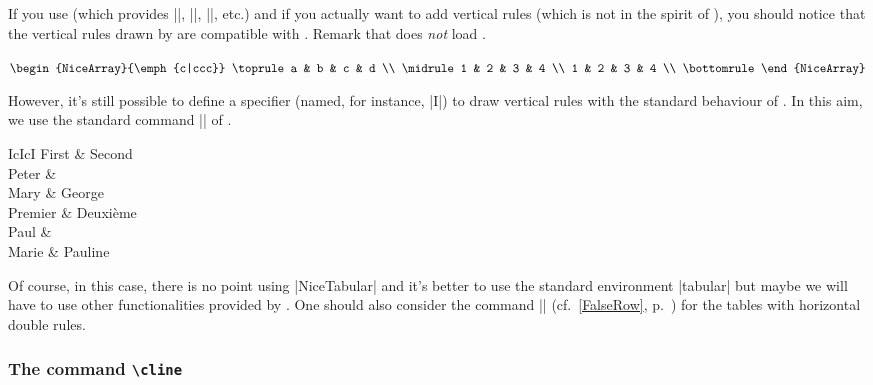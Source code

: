 \documentclass[dvipsnames]{article}
\begin{document}
\bigbreak
{}
If you use  (which provides |\toprule|, |\midrule|,
|\bottomrule|, etc.) and if you actually want to add vertical rules (which is
not in the spirit of ), you should notice that the vertical rules
drawn by  are compatible with . Remark that
 does \emph{not} load .

\medskip
\begin{Code}[width=10.5cm,show-output,no-cell-nodes]
$\begin{NiceArray}{\emph{c|ccc}} \toprule
  a & b & c & d \\ \midrule
  1 & 2 & 3 & 4 \\
  1 & 2 & 3 & 4 \\ \bottomrule
\end{NiceArray}$
\end{Code}

\bigskip
However, it's still possible to define a specifier (named, for instance, |I|)
to draw vertical rules with the standard behaviour of . In this aim, we use
the standard command |\newcolumntype| of .

\medskip
\begin{Code}[width=10cm,show-output]
\emph{\newcolumntype{I}{!{\vrule}}}
\begin{NiceTabular}{IcIcI} \hline
  First & Second \\ \hline\hline
  Peter & \\ \hline
  Mary  & George\\ \hline
Premier & Deuxième \\ \hline\hline
Paul  & \\ \hline
Marie & Pauline \\ \hline
\end{NiceTabular}
\end{Code}

\medskip
Of course, in this case, there is no point using |{NiceTabular}| and it's better
to use the standard environment |{tabular}| but maybe we will have to use other
functionalities provided by . One should also consider the
command |\FalseRow| (cf.~\ref{FalseRow}, p.~\pageref{FalseRow}) for the tables with
horizontal double rules.

\bigskip
\subsubsection{The command \texttt{\textbackslash cline}}
\end{document}
